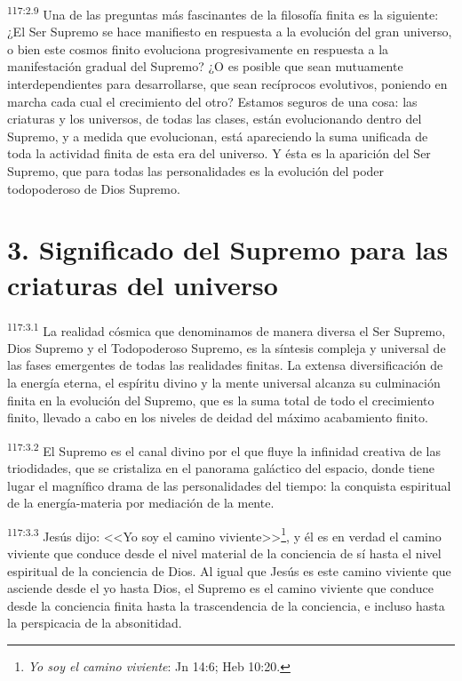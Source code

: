 \par
\textsuperscript{117:2.9} Una de las preguntas más fascinantes de la filosofía finita es la siguiente: ¿El Ser Supremo se hace manifiesto en respuesta a la evolución del gran universo, o bien este cosmos finito evoluciona progresivamente en respuesta a la manifestación gradual del Supremo? ¿O es posible que sean mutuamente interdependientes para desarrollarse, que sean recíprocos evolutivos, poniendo en marcha cada cual el crecimiento del otro? Estamos seguros de una cosa: las criaturas y los universos, de todas las clases, están evolucionando dentro del Supremo, y a medida que evolucionan, está apareciendo la suma unificada de toda la actividad finita de esta era del universo. Y ésta es la aparición del Ser Supremo, que para todas las personalidades es la evolución del poder todopoderoso de Dios Supremo.

\section*{3. Significado del Supremo para las criaturas del universo}
\par
\textsuperscript{117:3.1} La realidad cósmica que denominamos de manera diversa el Ser Supremo, Dios Supremo y el Todopoderoso Supremo, es la síntesis compleja y universal de las fases emergentes de todas las realidades finitas. La extensa diversificación de la energía eterna, el espíritu divino y la mente universal alcanza su culminación finita en la evolución del Supremo, que es la suma total de todo el crecimiento finito, llevado a cabo en los niveles de deidad del máximo acabamiento finito.

\par
\textsuperscript{117:3.2} El Supremo es el canal divino por el que fluye la infinidad creativa de las triodidades, que se cristaliza en el panorama galáctico del espacio, donde tiene lugar el magnífico drama de las personalidades del tiempo: la conquista espiritual de la energía-materia por mediación de la mente.

\par
\textsuperscript{117:3.3} Jesús dijo: <<Yo soy el camino viviente>>\footnote{\textit{Yo soy el camino viviente}: Jn 14:6; Heb 10:20.}, y él es en verdad el camino viviente que conduce desde el nivel material de la conciencia de sí hasta el nivel espiritual de la conciencia de Dios. Al igual que Jesús es este camino viviente que asciende desde el yo hasta Dios, el Supremo es el camino viviente que conduce desde la conciencia finita hasta la trascendencia de la conciencia, e incluso hasta la perspicacia de la absonitidad.

